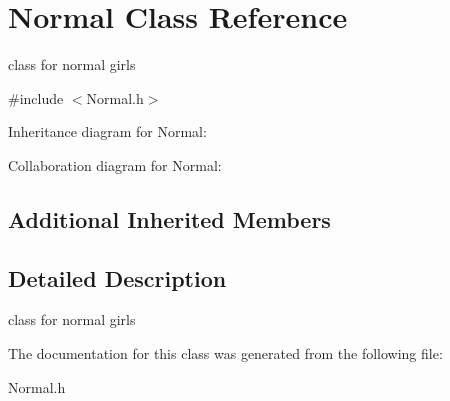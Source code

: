 \hypertarget{classNormal}{}\section{Normal Class Reference}
\label{classNormal}


class for normal girls  




{\ttfamily \#include $<$Normal.\+h$>$}



Inheritance diagram for Normal\+:


Collaboration diagram for Normal\+:
\subsection*{Additional Inherited Members}


\subsection{Detailed Description}
class for normal girls 

The documentation for this class was generated from the following file\+:\begin{DoxyCompactItemize}
\item 
Normal.\+h\end{DoxyCompactItemize}
